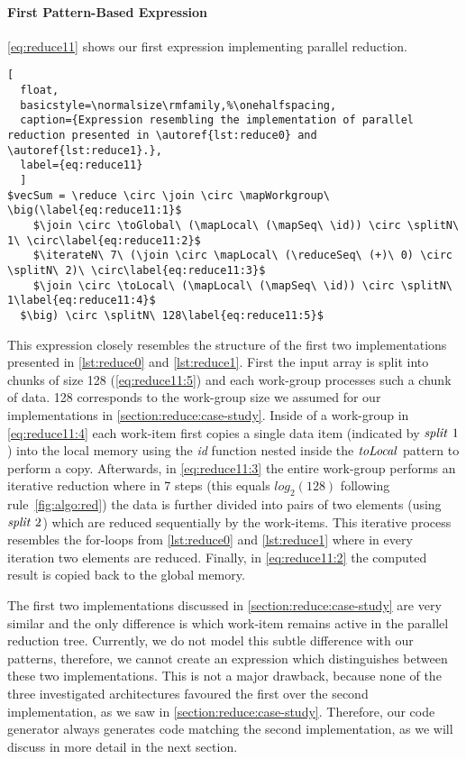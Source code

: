\paragraph{First Pattern-Based Expression}
\autoref{eq:reduce11} shows our first expression implementing parallel reduction.
\begin{lstlisting}[
  float,
  basicstyle=\normalsize\rmfamily,%\onehalfspacing,
  caption={Expression resembling the implementation of parallel reduction presented in \autoref{lst:reduce0} and \autoref{lst:reduce1}.},
  label={eq:reduce11}
  ]
$vecSum = \reduce \circ \join \circ \mapWorkgroup\ \big(\label{eq:reduce11:1}$
    $\join \circ \toGlobal\ (\mapLocal\ (\mapSeq\ \id)) \circ \splitN\ 1\ \circ\label{eq:reduce11:2}$
    $\iterateN\ 7\ (\join \circ \mapLocal\ (\reduceSeq\ (+)\ 0) \circ \splitN\ 2)\ \circ\label{eq:reduce11:3}$
    $\join \circ \toLocal\ (\mapLocal\ (\mapSeq\ \id)) \circ \splitN\ 1\label{eq:reduce11:4}$
  $\big) \circ \splitN\ 128\label{eq:reduce11:5}$
\end{lstlisting}
%
This expression closely resembles the structure of the first two implementations presented in \autoref{lst:reduce0} and \autoref{lst:reduce1}.
First the input array is split into chunks of size 128 (\autoref{eq:reduce11:5}) and each work-group processes such a chunk of data.
128 corresponds to the work-group size we assumed for our implementations in \autoref{section:reduce:case-study}.
Inside of a work-group in \autoref{eq:reduce11:4} each work-item first copies a single data item (indicated by $\text{\textit{split}}\ 1$) into the local memory using the \textit{id} function nested inside the $\text{\textit{toLocal}}$ pattern to perform a copy.
Afterwards, in \autoref{eq:reduce11:3} the entire work-group performs an iterative reduction where in 7 steps (this equals $log_2(128)$ following rule~\ref{fig:algo:red}) the data is further divided into pairs of two elements (using $\text{\textit{split}}\ 2$) which are reduced sequentially by the work-items.
This iterative process resembles the for-loops from \autoref{lst:reduce0} and \autoref{lst:reduce1} where in every iteration two elements are reduced.
Finally, in \autoref{eq:reduce11:2} the computed result is copied back to the global memory.

The first two implementations discussed in \autoref{section:reduce:case-study} are very similar and the only difference is which work-item remains active in the parallel reduction tree.
Currently, we do not model this subtle difference with our patterns, therefore, we cannot create an expression which distinguishes between these two implementations.
This is not a major drawback, because none of the three investigated architectures favoured the first over the second implementation, as we saw in \autoref{section:reduce:case-study}.
Therefore, our code generator always generates code matching the second implementation, as we will discuss in more detail in the next section.


